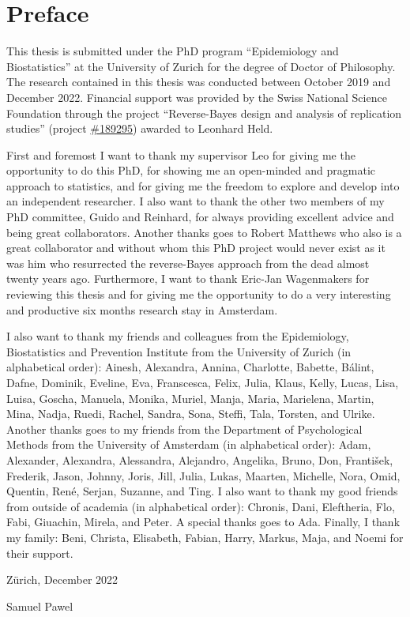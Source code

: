 \section*{Preface}

This thesis is submitted under the PhD program ``Epidemiology and
Biostatistics'' at the University of Zurich for the degree of Doctor of
Philosophy.
The research contained in this thesis was conducted between October 2019 and
December 2022. Financial support was provided by the Swiss National Science
Foundation through the project ``Reverse-Bayes design and analysis of
replication studies'' (project
\href{https://data.snf.ch/grants/grant/189295}{\#189295}) awarded to Leonhard
Held.

First and foremost I want to thank my supervisor Leo for giving me the
opportunity to do this PhD, for showing me an open-minded and pragmatic approach
to statistics, and for giving me the freedom to explore and develop into an
independent researcher. I also want to thank the other two members of my PhD
committee, Guido and Reinhard, for always providing excellent advice and being
great collaborators. Another thanks goes to Robert Matthews who also is a great
collaborator and without whom this PhD project would never exist as it was him
who resurrected the reverse-Bayes approach from the dead almost twenty years
ago. Furthermore, I want to thank Eric-Jan Wagenmakers for reviewing this thesis
and for giving me the opportunity to do a very interesting and productive six
months research stay in Amsterdam.

I also want to thank my friends and colleagues from the Epidemiology,
Biostatistics and Prevention Institute from the University of Zurich (in
alphabetical order): Ainesh, Alexandra, Annina, Charlotte, Babette, Bálint,
Dafne, Dominik, Eveline, Eva, Franscesca, Felix, Julia, Klaus, Kelly, Lucas,
Lisa, Luisa, Goscha, Manuela, Monika, Muriel, Manja, Maria, Marielena, Martin,
Mina, Nadja, Ruedi, Rachel, Sandra, Sona, Steffi, Tala, Torsten, and Ulrike.
Another thanks goes to my friends from the Department of Psychological Methods
from the University of Amsterdam (in alphabetical order): Adam, Alexander,
Alexandra, Alessandra, Alejandro, Angelika, Bruno, Don, František, Frederik,
Jason, Johnny, Joris, Jill, Julia, Lukas, Maarten, Michelle, Nora, Omid,
Quentin, René, Serjan, Suzanne, and Ting. I also want to thank my good friends
from outside of academia (in alphabetical order): Chronis, Dani, Eleftheria,
Flo, Fabi, Giuachin, Mirela, and Peter. A special thanks goes to Ada. Finally, I
thank my family: Beni, Christa, Elisabeth, Fabian, Harry, Markus, Maja, and
Noemi for their support.

\begin{flushright}
  \hfill Zürich, December 2022

  \hfill Samuel Pawel
\end{flushright}

